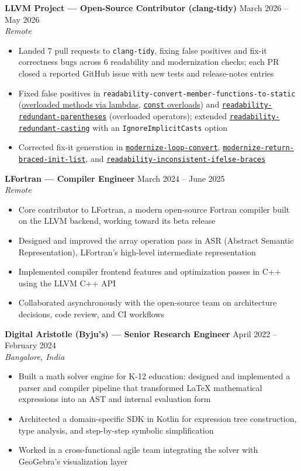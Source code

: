 \documentclass[11pt, a4paper]{article}
\newcommand{\role}[3]{%
    \vspace{0.4em}
    \noindent\textbf{#1} \hfill \textcolor{muted}{\small #3}\\[-0.3em]
    \textit{\textcolor{muted}{\small #2}}
    \vspace{0.1em}
}
\begin{document}
\role{LLVM Project --- Open-Source Contributor (clang-tidy)}{Remote}{March 2026 -- May 2026}
\begin{itemize}
    \item Landed 7 pull requests to \texttt{clang-tidy}, fixing false positives and fix-it correctness bugs across 6 readability and modernization checks; each PR closed a reported GitHub issue with new tests and release-notes entries
    \item Fixed false positives in \texttt{readability-convert-member-functions-to-static} (\href{https://github.com/llvm/llvm-project/pull/191432}{overloaded methods via lambdas}, \href{https://github.com/llvm/llvm-project/pull/191712}{\texttt{const} overloads}) and \href{https://github.com/llvm/llvm-project/pull/192254}{\texttt{readability-redundant-parentheses}} (overloaded operators); extended \href{https://github.com/llvm/llvm-project/pull/191386}{\texttt{readability-redundant-casting}} with an \texttt{IgnoreImplicitCasts} option
    \item Corrected fix-it generation in \href{https://github.com/llvm/llvm-project/pull/202015}{\texttt{modernize-loop-convert}}, \href{https://github.com/llvm/llvm-project/pull/195846}{\texttt{modernize-return-braced-init-list}}, and \href{https://github.com/llvm/llvm-project/pull/202869}{\texttt{readability-inconsistent-ifelse-braces}}
\end{itemize}


\role{LFortran --- Compiler Engineer}{Remote}{March 2024 -- June 2025}
\begin{itemize}
    \item Core contributor to LFortran, a modern open-source Fortran compiler built on the LLVM backend, working toward its beta release
    \item Designed and improved the array operation pass in ASR (Abstract Semantic Representation), LFortran's high-level intermediate representation
    \item Implemented compiler frontend features and optimization passes in C++ using the LLVM C++ API
    \item Collaborated asynchronously with the open-source team on architecture decisions, code review, and CI workflows
\end{itemize}

\role{Digital Aristotle (Byju's) --- Senior Research Engineer}{Bangalore, India}{April 2022 -- February 2024}
\begin{itemize}
    \item Built a math solver engine for K-12 education: designed and implemented a parser and compiler pipeline that transformed LaTeX mathematical expressions into an AST and internal evaluation form
    \item Architected a domain-specific SDK in Kotlin for expression tree construction, type analysis, and step-by-step symbolic simplification
    \item Worked in a cross-functional agile team integrating the solver with GeoGebra's visualization layer
\end{itemize}
\end{document}
